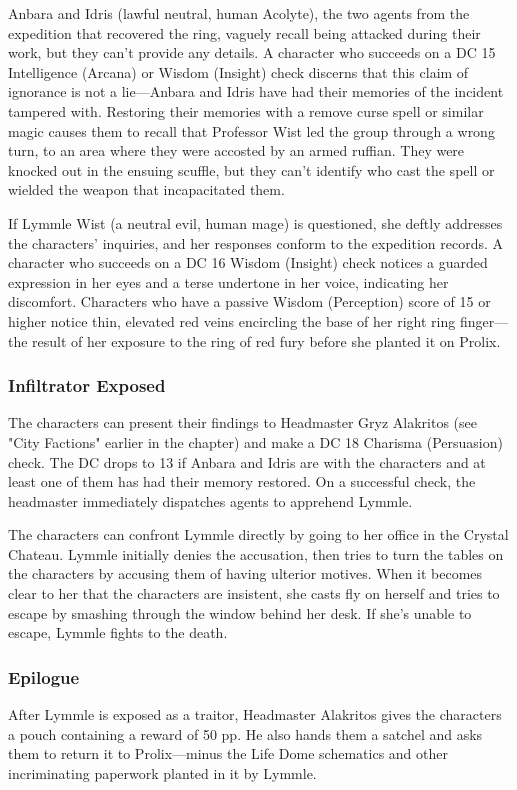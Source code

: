 \documentclass[10pt,a4paper,twoside,bg=print,twocolumn,openany,nodeprecatedcode]{dndbook}
\begin{document}
Anbara and Idris (lawful neutral, human Acolyte), the two agents from the expedition that recovered the ring, vaguely recall being attacked during their work, but they can't provide any details. A character who succeeds on a DC 15 Intelligence (Arcana) or Wisdom (Insight) check discerns that this claim of ignorance is not a lie—Anbara and Idris have had their memories of the incident tampered with. Restoring their memories with a remove curse spell or similar magic causes them to recall that Professor Wist led the group through a wrong turn, to an area where they were accosted by an armed ruffian. They were knocked out in the ensuing scuffle, but they can't identify who cast the spell or wielded the weapon that incapacitated them.

If Lymmle Wist (a neutral evil, human mage) is questioned, she deftly addresses the characters' inquiries, and her responses conform to the expedition records. A character who succeeds on a DC 16 Wisdom (Insight) check notices a guarded expression in her eyes and a terse undertone in her voice, indicating her discomfort. Characters who have a passive Wisdom (Perception) score of 15 or higher notice thin, elevated red veins encircling the base of her right ring finger—the result of her exposure to the ring of red fury before she planted it on Prolix.

\subsubsection{Infiltrator Exposed}
The characters can present their findings to Headmaster Gryz Alakritos (see "City Factions" earlier in the chapter) and make a DC 18 Charisma (Persuasion) check. The DC drops to 13 if Anbara and Idris are with the characters and at least one of them has had their memory restored. On a successful check, the headmaster immediately dispatches agents to apprehend Lymmle.

The characters can confront Lymmle directly by going to her office in the Crystal Chateau. Lymmle initially denies the accusation, then tries to turn the tables on the characters by accusing them of having ulterior motives. When it becomes clear to her that the characters are insistent, she casts fly on herself and tries to escape by smashing through the window behind her desk. If she's unable to escape, Lymmle fights to the death.

\subsubsection{Epilogue}
After Lymmle is exposed as a traitor, Headmaster Alakritos gives the characters a pouch containing a reward of 50 pp. He also hands them a satchel and asks them to return it to Prolix—minus the Life Dome schematics and other incriminating paperwork planted in it by Lymmle.
\end{document}
